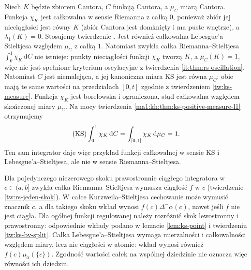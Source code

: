 \begin{przyklad}
Niech $K$ będzie zbiorem Cantora, $C$ funkcją Cantora, a $\mu_C$ miarą Cantora. Funkcja $\chi_K$ jest całkowalna w sensie Riemanna z całką $0$, ponieważ zbiór jej nieciągłości jest równy $K$ (zbiór Cantora jest domknięty i ma puste wnętrze), a $\lambda_1(K)=0$. Stosujemy twierdzenie . Jest również całkowalna Lebesgue'a--Stieltjesa względem $\mu_C$ z całką $1$. Natomiast zwykła całka Riemanna--Stieltjesa $\int_0^1\chi_K\,\mathrm dC$ nie istnieje: punkty nieciągłości funkcji $\chi_K$ tworzą $K$, a $\mu_C(K)=1$, więc nie jest spełnione kryterium oscylacyjne z twierdzenia \ref{it:thm:rs-oscillation}.
Natomiast $C$ jest niemalejąca, a jej kanoniczna miara
KS jest równa $\mu_C$: obie mają te same wartości
na przedziałach $[0,t]$ zgodnie z twierdzeniem
\ref{tw:ks-measure}. Funkcja $\chi_K$ jest borelowska
i ograniczona, stąd całkowalna względem skończonej
miary $\mu_C$. Na mocy twierdzenia
\ref{ma1:kh:thm:ks-positive-measure-l1} otrzymujemy
\[
 (\mathrm{KS})\int_0^1\chi_K\,\mathrm dC
 =\int_{[0,1]}\chi_K\,\mathrm d\mu_C=1.
\]
Ten sam integrator daje więc przykład funkcji
całkowalnej w sensie KS i Lebesgue'a--Stieltjesa,
ale nie w sensie Riemanna--Stieltjesa.
\end{przyklad}

\begin{uwaga}
Dla pojedynczego niezerowego skoku prawostronnie ciągłego integratora w $c\in(a,b]$ zwykła całka Riemanna--Stieltjesa wymusza ciągłość $f$ w $c$ (twierdzenie \ref{tw:rs-jeden-skok}). W całce Kurzweila--Stieltjesa cechowanie może wymusić znacznik $c$, a dla takiego skoku wkład wynosi $f(c)\Delta^-\alpha(c)$, nawet jeśli $f$ nie jest ciągła. Dla ogólnej funkcji regulowanej należy rozróżnić skok lewostronny i prawostronny: odpowiednie wkłady podano w lemacie \ref{lem:ks-point} i twierdzeniu \ref{tw:ks-bv-split}. Całka Lebesgue'a--Stieltjesa wymaga mierzalności i całkowalności względem miary, lecz nie ciągłości w atomie: wkład wynosi również $f(c)\mu_\alpha(\{c\})$. Zgodność wartości całek na wspólnej dziedzinie
nie oznacza więc równości ich dziedzin.
\end{uwaga}
\endgroup

